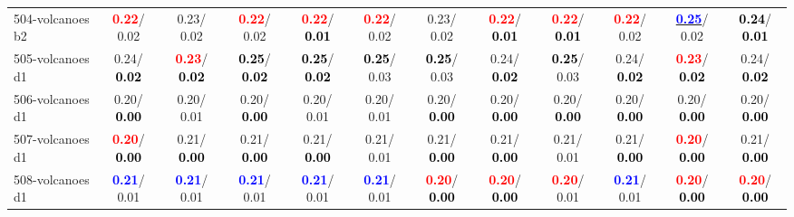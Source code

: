 \begin{table}[h]
\begin{center}
{\begin{tabular}{lc|c|c|c|c|c|c|c|c|c|c}
504-volcanoes b2 & \textcolor{red}{\textbf{  0.22}}/  0.02 &   0.23/  0.02 & \textcolor{red}{\textbf{  0.22}}/  0.02 & \textcolor{red}{\textbf{  0.22}}/\textcolor{black}{\textbf{  0.01}} & \textcolor{red}{\textbf{  0.22}}/  0.02 &   0.23/  0.02 & \textcolor{red}{\textbf{  0.22}}/\textcolor{black}{\textbf{  0.01}} & \textcolor{red}{\textbf{  0.22}}/\textcolor{black}{\textbf{  0.01}} & \textcolor{red}{\textbf{  0.22}}/  0.02 & \underline{\textcolor{blue}{\textbf{  0.25}}}/  0.02 & \textcolor{black}{\textbf{  0.24}}/\textcolor{black}{\textbf{  0.01}} \\
505-volcanoes d1 &   0.24/\textcolor{black}{\textbf{  0.02}} & \textcolor{red}{\textbf{  0.23}}/\textcolor{black}{\textbf{  0.02}} & \textcolor{black}{\textbf{  0.25}}/\textcolor{black}{\textbf{  0.02}} & \textcolor{black}{\textbf{  0.25}}/\textcolor{black}{\textbf{  0.02}} & \textcolor{black}{\textbf{  0.25}}/  0.03 & \textcolor{black}{\textbf{  0.25}}/  0.03 &   0.24/\textcolor{black}{\textbf{  0.02}} & \textcolor{black}{\textbf{  0.25}}/  0.03 &   0.24/\textcolor{black}{\textbf{  0.02}} & \textcolor{red}{\textbf{  0.23}}/\textcolor{black}{\textbf{  0.02}} &   0.24/\textcolor{black}{\textbf{  0.02}} \\
506-volcanoes d1 &   0.20/\textcolor{black}{\textbf{  0.00}} &   0.20/  0.01 &   0.20/\textcolor{black}{\textbf{  0.00}} &   0.20/  0.01 &   0.20/  0.01 &   0.20/\textcolor{black}{\textbf{  0.00}} &   0.20/\textcolor{black}{\textbf{  0.00}} &   0.20/\textcolor{black}{\textbf{  0.00}} &   0.20/\textcolor{black}{\textbf{  0.00}} &   0.20/\textcolor{black}{\textbf{  0.00}} &   0.20/\textcolor{black}{\textbf{  0.00}} \\
507-volcanoes d1 & \textcolor{red}{\textbf{  0.20}}/\textcolor{black}{\textbf{  0.00}} &   0.21/\textcolor{black}{\textbf{  0.00}} &   0.21/\textcolor{black}{\textbf{  0.00}} &   0.21/\textcolor{black}{\textbf{  0.00}} &   0.21/  0.01 &   0.21/\textcolor{black}{\textbf{  0.00}} &   0.21/\textcolor{black}{\textbf{  0.00}} &   0.21/  0.01 &   0.21/\textcolor{black}{\textbf{  0.00}} & \textcolor{red}{\textbf{  0.20}}/\textcolor{black}{\textbf{  0.00}} &   0.21/\textcolor{black}{\textbf{  0.00}} \\
508-volcanoes d1 & \textcolor{blue}{\textbf{  0.21}}/  0.01 & \textcolor{blue}{\textbf{  0.21}}/  0.01 & \textcolor{blue}{\textbf{  0.21}}/  0.01 & \textcolor{blue}{\textbf{  0.21}}/  0.01 & \textcolor{blue}{\textbf{  0.21}}/  0.01 & \textcolor{red}{\textbf{  0.20}}/\textcolor{black}{\textbf{  0.00}} & \textcolor{red}{\textbf{  0.20}}/\textcolor{black}{\textbf{  0.00}} & \textcolor{red}{\textbf{  0.20}}/  0.01 & \textcolor{blue}{\textbf{  0.21}}/  0.01 & \textcolor{red}{\textbf{  0.20}}/\textcolor{black}{\textbf{  0.00}} & \textcolor{red}{\textbf{  0.20}}/\textcolor{black}{\textbf{  0.00}} \\ \hline

\end{tabular}}
\end{center}
\end{table}
